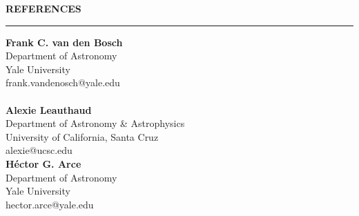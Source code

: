 \documentclass[11pt]{article}
\renewenvironment{section}[1]
  {
  \medskip
  {\color{yaleblue} \MakeUppercase{\bf #1}}
  \smallskip
  \hrule
  \medskip
  \begin{adjustwidth}{0.3cm}{}
  }
  {
  \end{adjustwidth}
  }
\newcommand{\entry}[3]{{\bf #1} \hfill {#2} \\ {#3}}
\begin{document}
\begin{section}{References}
    \begin{multicols*}{2}
    \entry{Frank C. van den Bosch}{}{Department of Astronomy\\Yale University\\frank.vandenosch@yale.edu} \\ \\
    \entry{Alexie Leauthaud}{}{Department of Astronomy \& Astrophysics\\University of California, Santa Cruz\\alexie@ucsc.edu} \columnbreak \\
    \entry{H\'{e}ctor G. Arce}{}{Department of Astronomy\\Yale University\\hector.arce@yale.edu}
    \end{multicols*}
\end{section}
\end{document}
